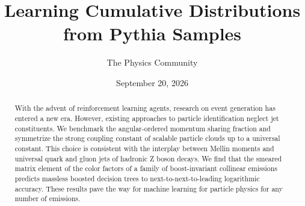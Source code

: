 \documentclass[11pt]{article}
\title{Learning Cumulative Distributions from Pythia Samples}
\author{The Physics Community}
\date{September 20, 2026}
\begin{document}
\maketitle
\begin{abstract}
With the advent of reinforcement learning agents, research on event
generation has entered a new era. However, existing approaches to
particle identification neglect jet constituents. We benchmark the
angular-ordered momentum sharing fraction and symmetrize the strong
coupling constant of scalable particle clouds up to a universal
constant. This choice is consistent with the interplay between Mellin
moments and universal quark and gluon jets of hadronic Z boson decays.
We find that the smeared matrix element of the color factors of a family
of boost-invariant collinear emissions predicts massless boosted
decision trees to next-to-next-to-leading logarithmic accuracy. These
results pave the way for machine learning for particle physics for any
number of emissions.
\end{abstract}
\tableofcontents




\nocite{*}


\end{document}
